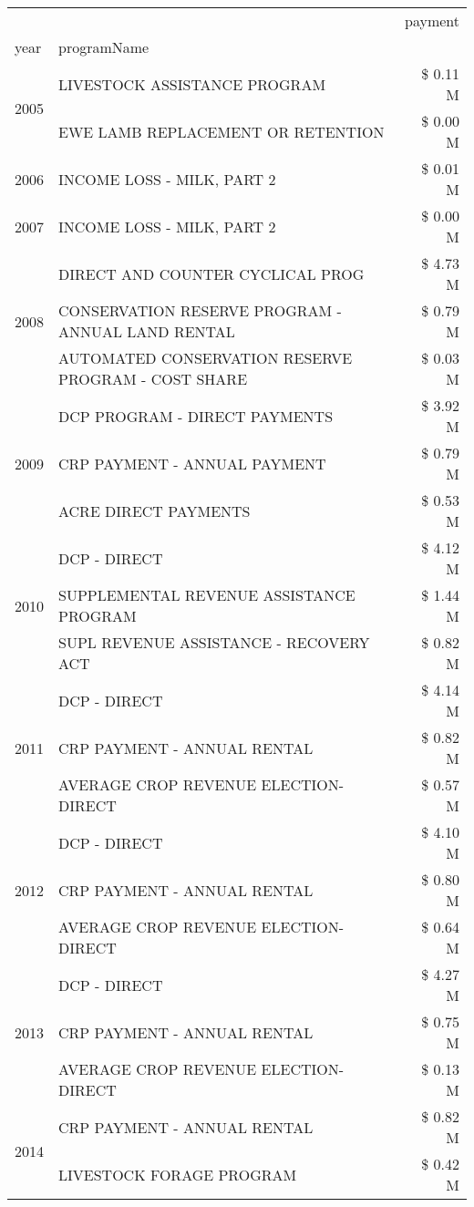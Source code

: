 \begin{tabular}{llr}
\toprule
 &  & payment \\
year & programName &  \\
\midrule
\multirow[t]{2}{*}{2005} & LIVESTOCK ASSISTANCE PROGRAM & \$ 0.11 M \\
 & EWE LAMB REPLACEMENT OR RETENTION & \$ 0.00 M \\
\cline{1-3}
2006 & INCOME LOSS - MILK, PART 2 & \$ 0.01 M \\
\cline{1-3}
2007 & INCOME LOSS - MILK, PART 2 & \$ 0.00 M \\
\cline{1-3}
\multirow[t]{3}{*}{2008} & DIRECT AND COUNTER CYCLICAL PROG & \$ 4.73 M \\
 & CONSERVATION RESERVE PROGRAM - ANNUAL LAND RENTAL & \$ 0.79 M \\
 & AUTOMATED CONSERVATION RESERVE PROGRAM - COST SHARE & \$ 0.03 M \\
\cline{1-3}
\multirow[t]{3}{*}{2009} & DCP PROGRAM - DIRECT PAYMENTS & \$ 3.92 M \\
 & CRP PAYMENT - ANNUAL PAYMENT & \$ 0.79 M \\
 & ACRE DIRECT PAYMENTS & \$ 0.53 M \\
\cline{1-3}
\multirow[t]{3}{*}{2010} & DCP - DIRECT & \$ 4.12 M \\
 & SUPPLEMENTAL REVENUE ASSISTANCE PROGRAM & \$ 1.44 M \\
 & SUPL REVENUE ASSISTANCE - RECOVERY ACT & \$ 0.82 M \\
\cline{1-3}
\multirow[t]{3}{*}{2011} & DCP - DIRECT & \$ 4.14 M \\
 & CRP PAYMENT - ANNUAL RENTAL & \$ 0.82 M \\
 & AVERAGE CROP REVENUE ELECTION-DIRECT & \$ 0.57 M \\
\cline{1-3}
\multirow[t]{3}{*}{2012} & DCP - DIRECT & \$ 4.10 M \\
 & CRP PAYMENT - ANNUAL RENTAL & \$ 0.80 M \\
 & AVERAGE CROP REVENUE ELECTION-DIRECT & \$ 0.64 M \\
\cline{1-3}
\multirow[t]{3}{*}{2013} & DCP - DIRECT & \$ 4.27 M \\
 & CRP PAYMENT - ANNUAL RENTAL & \$ 0.75 M \\
 & AVERAGE CROP REVENUE ELECTION-DIRECT & \$ 0.13 M \\
\cline{1-3}
\multirow[t]{3}{*}{2014} & CRP PAYMENT - ANNUAL RENTAL & \$ 0.82 M \\
 & LIVESTOCK FORAGE PROGRAM & \$ 0.42 M \\

\end{tabular}
